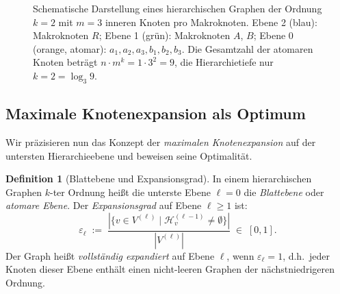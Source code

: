 ﻿\documentclass[12pt,a4paper,twoside]{article}
\theoremstyle{definition}
\newtheorem{definition}{Definition}[section]
\theoremstyle{plain}
\theoremstyle{remark}
\begin{document}
\begin{figure}[h]
	\centering
	\caption{Schematische Darstellung eines hierarchischen Graphen der
		Ordnung $k=2$ mit $m=3$ inneren Knoten pro Makroknoten.
		Ebene 2 (blau): Makroknoten $R$; Ebene 1 (grün):
		Makroknoten $A$, $B$; Ebene 0 (orange, atomar):
		$a_1, a_2, a_3, b_1, b_2, b_3$.  Die Gesamtzahl der
		atomaren Knoten beträgt $n \cdot m^k = 1 \cdot 3^2 = 9$,
		die Hierarchietiefe nur $k=2 = \log_3 9$.}
	\label{fig:hierarchie_baum}
\end{figure}

\subsection{Maximale Knotenexpansion als Optimum}
\label{sub:blattebene}

Wir präzisieren nun das Konzept der \emph{maximalen Knotenexpansion}
auf der untersten Hierarchieebene und beweisen seine Optimalität.

\begin{definition}[Blattebene und Expansionsgrad]
	\label{def:blatt}
	In einem hierarchischen Graphen $k$-ter Ordnung heißt die unterste
	Ebene $\ell = 0$ die \emph{Blattebene} oder \emph{atomare Ebene}.
	Der \emph{Expansionsgrad} auf Ebene $\ell \geq 1$ ist:
	\[
	\varepsilon_\ell \;:=\;
	\frac{|\{v \in V^{(\ell)} \mid \mathcal{H}^{(\ell-1)}_v \neq \emptyset\}|}{|V^{(\ell)}|}
	\;\in\; [0,1].
	\]
	Der Graph heißt \emph{vollständig expandiert} auf Ebene $\ell$,
	wenn $\varepsilon_\ell = 1$, d.h.\ jeder Knoten dieser Ebene enthält
	einen nicht-leeren Graphen der nächstniedrigeren Ordnung.
\end{definition}
\end{document}
